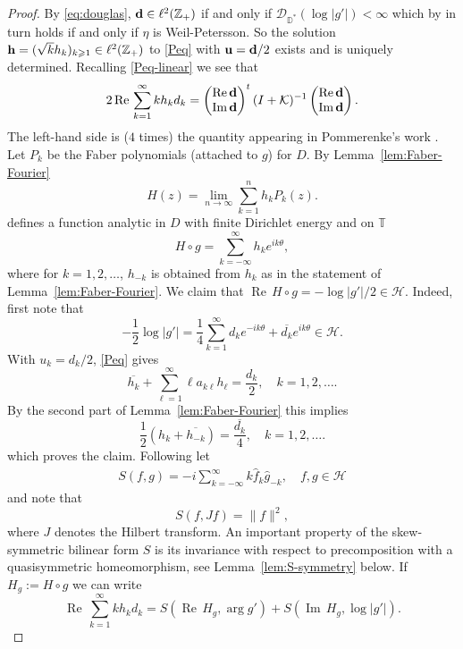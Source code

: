 \documentclass{article}
\numberwithin{equation}{section}
\numberwithin{figure}{section}
\theoremstyle{plain}
\theoremstyle{plain}
\numberwithin{thm}{section}
\theoremstyle{remark}
\newcommand{\imag}{\operatorname{Im} \,}
\newcommand{\real}{\operatorname{Re} \,}
\renewcommand{\Im}{\imag}
\renewcommand{\Re}{\real}
\newcommand{\re}{\text{{\rm Re}\,}}
\newcommand{\im}{\text{{\rm Im}\,}}
\newcommand{\T}{\mathbb{T}}
\newcommand{\D}{\mathbb{D}}
\newcommand{\Z}{\mathbb{Z}}
\let \ge \geqslant
\begin{document}
\begin{proof}
By \eqref{eq:douglas}, ${\bf d} \in \ell^2(\Z_+)$ if and only if $\mathcal{D}_{\D^*}(\log|g'|) < \infty$ which by \cite[Thm 2.1.12]{TT} in turn holds if and only if $\eta$ is Weil-Petersson. So the solution ${\bf h}=(\sqrt{k} h_k)_{k \ge 1} \in \ell^2(\Z_+)$ to \eqref{Peq} with ${\bf u} = {\bf d}/2$ exists and is uniquely determined. 
Recalling \eqref{Peq-linear} we see that
\[2 \Re \sum_{k = 1}^\infty k h_k d_k=\begin{pmatrix}
     \re {\bf d} \\ \im {\bf d}
 \end{pmatrix} ^t(I+\mathcal{K})^{-1} 
\begin{pmatrix}
     \re {\bf d} \\ \im {\bf d}
 \end{pmatrix}.
 \]
 The left-hand side is ($4$ times) the quantity appearing in Pommerenke's work \cite{pom67, pom69}.
Let $P_k$ be the Faber polynomials (attached to $g$) for $D$. By Lemma~\ref{lem:Faber-Fourier} \[
H(z) = \lim_{n \to \infty} \sum_{k=1}^n h_k P_k(z).
\] 
defines a function analytic in $D$ with finite Dirichlet energy and on $\T$
\[H \circ g = \sum_{k=-\infty}^\infty h_k e^{ik\theta},\]
where for $k=1,2,\ldots$, $h_{-k}$ is obtained from $h_k$ as in the statement of Lemma~\ref{lem:Faber-Fourier}.
We claim that
$\Re H \circ g = -\log|g'|/2 \in \mathscr{H}$. Indeed, first note that
\[
 - \frac{1}{2}\log|g'| = \frac{1}{4} \sum_{k=1}^\infty d_k e^{-ik \theta} + \overline{d_k} e^{ik \theta} \in \mathscr{H}.
\]
With $u_k=d_k/2$, \eqref{Peq} gives 
\begin{equation} \label{P:eq2}
\overline{h_k} + \sum_{\ell =1}^\infty \ell a_{k\ell} h_{\ell} = \frac{d_k}{2}, \quad k=1,2,\ldots.
\end{equation}
By the second part of Lemma~\ref{lem:Faber-Fourier} this implies 
\[
\frac{1}{2}(h_k + \overline{h_{-k}})= \overline{\frac{d_k}{4}}, \quad k=1,2,\ldots.
\]
which proves the claim.
Following \cite{NS} let
\begin{align}\label{NS-symplectic}
S(f,g) = - i\sum_{k=-\infty}^\infty k \hat f_k \hat g_{-k}, \quad f,g \in \mathscr{H}
\end{align}
and note that 
\[
S(f,Jf) = \|f\|^2,
\]
where $J$ denotes the Hilbert transform. An important property of the skew-symmetric bilinear form $S$ is its invariance with respect to precomposition with a quasisymmetric homeomorphism, see Lemma~\ref{lem:S-symmetry} below.
If $H_g := H \circ g$ we can write 
\[   \Re \sum_{k = 1}^\infty k h_k d_k =S(\Re H_g, \arg g') + S(\Im H_g, \log|g'|).\]

\end{proof}
\end{document}
